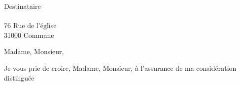 \documentclass[11pt]{lettre}
\makeatletter
\newcommand*{\NoRule}{\renewcommand*{\rule@length}{0}}
\makeatother
\begin{document}
%
\begin{letter}{Destinataire\\~\\
76 Rue de l'église\\
31000 Commune \\
}
\date{\today{}} 
\NoRule
\vspace{-100px}
%

\opening{Madame, Monsieur,}
\lipsum[1]

\closing{Je vous prie de croire, Madame, Monsieur, à l'assurance de ma considération distinguée}
\end{letter}
\end{document}
